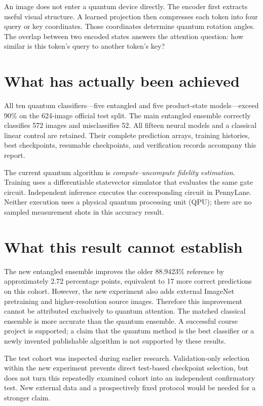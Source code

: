 \documentclass[11pt,a4paper]{report}
\begin{document}
An image does not enter a quantum device directly. The encoder first extracts useful visual structure. A learned projection then compresses each token into four query or key coordinates. Those coordinates determine quantum rotation angles. The overlap between two encoded states answers the attention question: how similar is this token's query to another token's key?

\section{What has actually been achieved}
All ten quantum classifiers---five entangled and five product-state models---exceed 90\% on the 624-image official test split. The main entangled ensemble correctly classifies 572 images and misclassifies 52. All fifteen neural models and a classical linear control are retained. Their complete prediction arrays, training histories, best checkpoints, resumable checkpoints, and verification records accompany this report.

The current quantum algorithm is \emph{compute--uncompute fidelity estimation}. Training uses a differentiable statevector simulator that evaluates the same gate circuit. Independent inference executes the corresponding circuit in PennyLane. Neither execution uses a physical quantum processing unit (QPU); there are no sampled measurement shots in this accuracy result.

\section{What this result cannot establish}
The new entangled ensemble improves the older 88.9423\% reference by approximately 2.72 percentage points, equivalent to 17 more correct predictions on this cohort. However, the new experiment also adds external ImageNet pretraining and higher-resolution source images. Therefore this improvement cannot be attributed exclusively to quantum attention. The matched classical ensemble is more accurate than the quantum ensemble. A successful course project is supported; a claim that the quantum method is the best classifier or a newly invented publishable algorithm is not supported by these results.

The test cohort was inspected during earlier research. Validation-only selection within the new experiment prevents direct test-based checkpoint selection, but does not turn this repeatedly examined cohort into an independent confirmatory test. New external data and a prospectively fixed protocol would be needed for a stronger claim.
\end{document}
